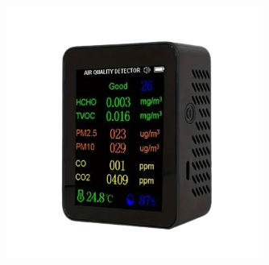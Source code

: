\begin{inhalt}
\begin{figure}[!htb]
\centering
\includegraphics[width=0.75\textwidth]{files/Thomas/pics/new/Temu-removebg-preview.png}
\caption[Bildbezeichnung für Abbildungsverzeichnis]{}
\label{fig:gehaeuse_internet_bild}
\end{figure}



\end{inhalt}